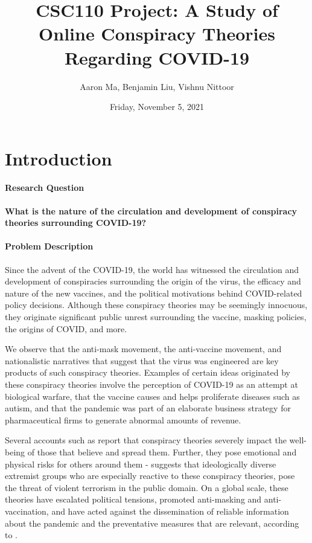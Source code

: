 \documentclass[fontsize=11pt]{article}
\title{CSC110 Project: A Study of Online Conspiracy Theories Regarding COVID-19}
\author{Aaron Ma, Benjamin Liu, Vishnu Nittoor}
\date{Friday, November 5, 2021}
\begin{document}
\maketitle

\section{Introduction}

\paragraph{Research Question} \textbf{What is the nature of the circulation and development of conspiracy theories surrounding COVID-19?}

\paragraph{Problem Description} Since the advent of the COVID-19, the world has witnessed the circulation and development of conspiracies surrounding the origin of the virus, the efficacy and nature of the new vaccines, and the political motivations behind COVID-related policy decisions. Although these conspiracy theories may be seemingly innocuous, they originate significant public unrest surrounding the vaccine, masking policies, the origins of COVID, and more.

We observe that the anti-mask movement, the anti-vaccine movement, and nationalistic narratives that suggest that the virus was engineered are key products of such conspiracy theories. Examples of certain ideas originated by these conspiracy theories involve the perception of COVID-19 as an attempt at biological warfare, that the vaccine causes and helps proliferate diseases such as autism, and that the pandemic was part of an elaborate business strategy for pharmaceutical firms to generate abnormal amounts of revenue.

Several accounts such as \cite{PeopleWh91:online} report that conspiracy theories severely impact the well-being of those that believe and spread them. Further, they pose emotional and physical risks for others around them - \cite{10.2307/27040260} suggests that ideologically diverse extremist groups who are especially reactive to these conspiracy theories, pose the threat of violent terrorism in the public domain. On a global scale, these theories have escalated political tensions, promoted anti-masking and anti-vaccination, and have acted against the dissemination of reliable information about the pandemic and the preventative measures that are relevant, according to \cite{COVID19c99:online}. 
\end{document}
